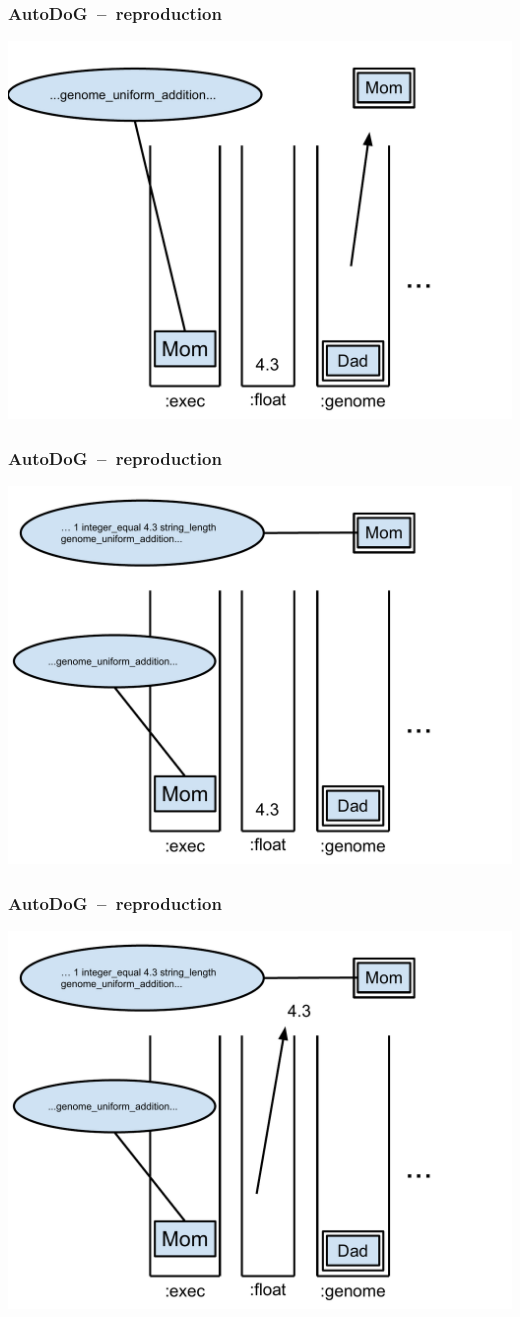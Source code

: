 \documentclass{beamer}
\begin{document}
\begin{frame}
	\frametitle{AutoDoG~--~reproduction}
	\includegraphics[width=.9\textwidth]{Illustrations/autodog_8.PDF}
\end{frame}

\begin{frame}
	\frametitle{AutoDoG~--~reproduction}
	\includegraphics[width=.9\textwidth]{Illustrations/autodog_9.PDF}
\end{frame}

\begin{frame}
	\frametitle{AutoDoG~--~reproduction}
	\includegraphics[width=.9\textwidth]{Illustrations/autodog_10.PDF}
\end{frame}
\end{document}
